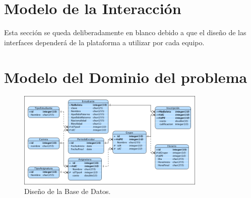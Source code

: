 \documentclass[oneside,10pt]{book}
\begin{document}

\chapter{Modelo de la Interacción}

{\color{UCInterfaceColor} 
	Esta sección se queda deliberadamente en blanco debido a que el diseño de las interfaces dependerá de la plataforma a utilizar por cada equipo.\\	
}



\chapter{Modelo del Dominio del problema}

	\begin{figure}[htbp!]
		\centering
			\includegraphics[width=0.8\textwidth]{images/baseDeDatos}
		\caption{Diseño de la Base de Datos.}
	\end{figure}
	
\end{document}
